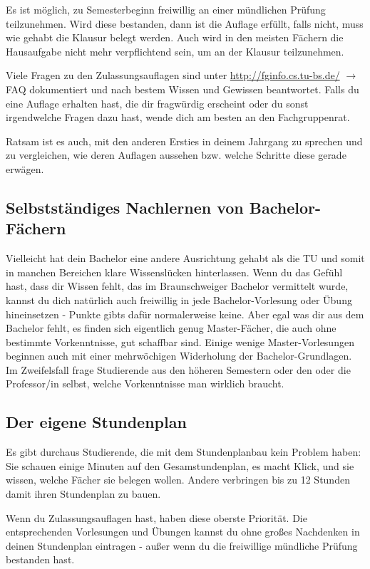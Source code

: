 \begin{multicols}{2}
	Es ist möglich, zu Semesterbeginn freiwillig an einer mündlichen Prüfung teilzunehmen. Wird diese bestanden, dann ist die Auflage erfüllt, falls nicht, muss wie gehabt die Klausur belegt werden. Auch wird in den meisten Fächern die Hausaufgabe nicht mehr verpflichtend sein, um an der Klausur teilzunehmen.

	Viele Fragen zu den Zulassungsauflagen sind unter \url{http://fginfo.cs.tu-bs.de/} $\rightarrow$ FAQ dokumentiert und nach bestem Wissen und Gewissen beantwortet. Falls du eine Auflage erhalten hast, die dir fragwürdig erscheint oder du sonst irgendwelche Fragen dazu hast, wende dich am besten an den Fachgruppenrat.

	Ratsam ist es auch, mit den anderen Ersties in deinem Jahrgang zu sprechen und zu vergleichen, wie deren Auflagen aussehen bzw. welche Schritte diese gerade erwägen. 

	\subsection{Selbstständiges Nachlernen von Bachelor-Fächern}
		Vielleicht hat dein Bachelor eine andere Ausrichtung gehabt als die TU und somit in manchen Bereichen klare Wissenslücken hinterlassen. Wenn du das Gefühl hast, dass dir Wissen fehlt, das im Braunschweiger Bachelor vermittelt wurde, kannst du dich natürlich auch freiwillig in jede Bachelor-Vorlesung oder Übung hineinsetzen - Punkte gibts dafür normalerweise keine. Aber egal was dir aus dem Bachelor fehlt, es finden sich eigentlich genug Master-Fächer, die auch ohne bestimmte Vorkenntnisse, gut schaffbar sind. Einige wenige Master-Vorlesungen beginnen auch mit einer mehrwöchigen Widerholung der Bachelor-Grundlagen. Im Zweifelsfall frage Studierende aus den höheren Semestern oder den oder die Professor/in selbst, welche Vorkenntnisse man wirklich braucht.

	\subsection{Der eigene Stundenplan}
		\label{masterstundenplan}
		Es gibt durchaus Studierende, die mit dem Stundenplanbau kein Problem haben: Sie schauen einige Minuten auf den Gesamstundenplan, es macht Klick, und sie wissen, welche Fächer sie belegen wollen. Andere verbringen bis zu 12 Stunden damit ihren Stundenplan zu bauen.

		Wenn du Zulassungsauflagen hast, haben diese oberste Priorität. Die entsprechenden Vorlesungen und Übungen kannst du ohne großes Nachdenken in deinen Stundenplan eintragen - außer wenn du die freiwillige mündliche Prüfung bestanden hast.


\end{multicols}
